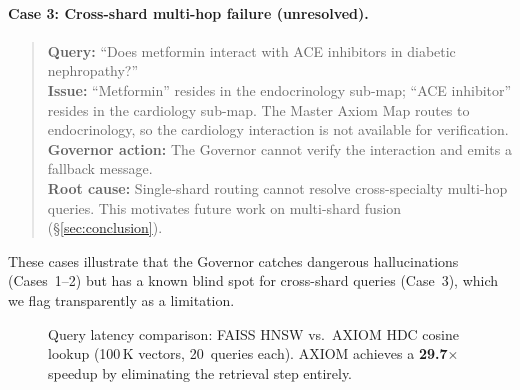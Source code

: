\documentclass[11pt,a4paper]{article}
\begin{document}
\paragraph{Case 3: Cross-shard multi-hop failure (unresolved).}
\begin{quote}
\textbf{Query:} ``Does metformin interact with ACE inhibitors
in diabetic nephropathy?''\\
\textbf{Issue:} ``Metformin'' resides in the endocrinology sub-map;
``ACE inhibitor'' resides in the cardiology sub-map.  The Master
Axiom Map routes to endocrinology, so the cardiology interaction
is not available for verification.\\
\textbf{Governor action:} The Governor cannot verify the interaction
and emits a fallback message.\\
\textbf{Root cause:} Single-shard routing cannot resolve
cross-specialty multi-hop queries.  This motivates future work on
multi-shard fusion (\S\ref{sec:conclusion}).
\end{quote}

These cases illustrate that the Governor catches dangerous
hallucinations (Cases~1--2) but has a known blind spot for
cross-shard queries (Case~3), which we flag transparently as a
limitation.

\begin{figure}[t]
    \centering
    \caption{Query latency comparison: FAISS HNSW vs.\ AXIOM HDC
    cosine lookup (100\,K vectors, 20~queries each).
    AXIOM achieves a \textbf{29.7$\times$} speedup by eliminating
    the retrieval step entirely.}
    \label{fig:latency}
\end{figure}
\end{document}
